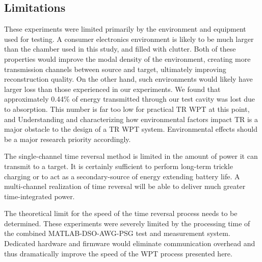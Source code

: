 \subsection{Limitations}
\label{sec:limitations}


These experiments were limited primarily by the environment and equipment used
for testing.
%
A consumer electronics environment is likely to be much larger than the chamber
used in this study, and filled with clutter.
%
Both of these properties would improve the modal density of the environment,
creating more transmission channels between source and target, ultimately
improving reconstruction quality.
%
On the other hand, such environments would likely have larger loss
than those experienced in our experiments. We found that approximately 0.44\% of energy transmitted through our test cavity was lost due to absorption. This number is far too low for practical TR WPT at this point, and Understanding and characterizing how environmental factors impact TR is a major obstacle to the design of a TR WPT system. Environmental effects should be a major research priority accordingly.


The single-channel time reversal method is limited in the amount of power it can
transmit to a target.
%
It is certainly sufficient to perform long-term trickle charging or to act as a
secondary-source of energy extending battery life.
%
A multi-channel realization of time reversal will be able to deliver much
greater time-integrated power.



The theoretical limit for the speed of the time reversal process needs to be
determined.
%
These experiments were severely limited by the processing time of the combined
MATLAB-DSO-AWG-PSG test and measurement system.
%
Dedicated hardware and firmware would eliminate communication overhead and thus
dramatically improve the speed of the WPT process presented here.
